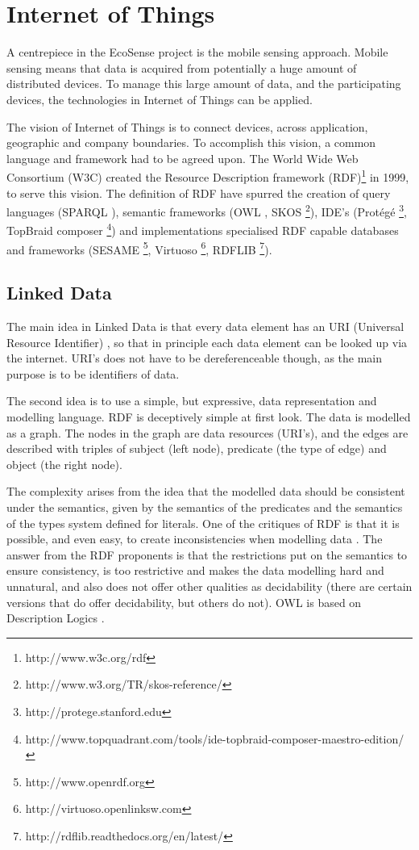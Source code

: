 \section{Internet of Things}\label{IoT}
A centrepiece in the EcoSense project is the mobile sensing approach. Mobile sensing means that data is acquired from potentially a huge amount of distributed devices. To manage this large amount of data, and the participating devices, the technologies in Internet of Things can be applied.
 
The vision of Internet of Things is to connect devices, across application, geographic and company boundaries. To accomplish this vision, a common language and framework had to be agreed upon. The World Wide Web Consortium (W3C) created the Resource Description framework (RDF)\footnote{http://www.w3c.org/rdf} in 1999, to serve this vision. The definition of RDF have spurred the creation of query languages (SPARQL \cite{prud2008sparql}), semantic frameworks (OWL \cite{mcguinness2004owl}, SKOS \footnote{http://www.w3.org/TR/skos-reference/}), IDE's (Prot\'eg\'e \footnote{http://protege.stanford.edu}, TopBraid composer \footnote{http://www.topquadrant.com/tools/ide-topbraid-composer-maestro-edition/}) and implementations specialised RDF capable databases and frameworks (SESAME \footnote{http://www.openrdf.org}, Virtuoso \footnote{http://virtuoso.openlinksw.com}, RDFLIB \footnote{http://rdflib.readthedocs.org/en/latest/}).

\subsection{Linked Data}
The main idea in Linked Data is that every data element has an URI (Universal Resource Identifier) \cite{rfc23961998uniform}, so that in principle each data element can be looked up via the internet. URI's does not have to be dereferenceable though, as the main purpose is to be identifiers of data. 

The second idea is to use a simple, but expressive, data representation and modelling language. RDF is deceptively simple at first look. The data is modelled as a graph. The nodes in the graph are data resources (URI's), and the edges are described with triples of subject (left node), predicate (the type of edge) and object (the right node).

The complexity arises from the idea that the modelled data should be consistent under the semantics, given by the semantics of the predicates and the semantics of the types system defined for literals. One of the critiques of RDF is that it is possible, and even easy, to create inconsistencies when modelling data \cite{Horrocks2003}. The answer from the RDF proponents is that the restrictions put on the semantics to ensure consistency, is too restrictive and makes the data modelling hard and unnatural, and also does not offer other qualities as decidability (there are certain versions that do offer decidability, but others do not).	
OWL is based on Description Logics \cite{horrocks200714}.

